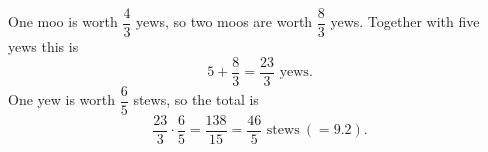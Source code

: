One moo is worth $\dfrac{4}{3}$ yews, so two moos are worth $\dfrac{8}{3}$ yews. Together with five yews this is
\[
5+\dfrac{8}{3}=\dfrac{23}{3}\text{ yews}.
\]
One yew is worth $\dfrac{6}{5}$ stews, so the total is
\[
\dfrac{23}{3}\cdot\dfrac{6}{5}=\dfrac{138}{15}=\boxed{\dfrac{46}{5}}\text{ stews}\ \left(=9.2\right).
\]

